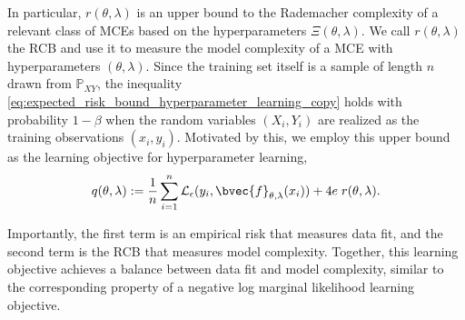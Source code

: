 \documentclass[runningheads, envcountsame, a4paper]{llncs}
\begin{document}
		In particular, $r(\theta, \lambda)$ is an upper bound to the Rademacher complexity of a relevant class of \glspl{MCE} based on the hyperparameters $\Xi(\theta, \lambda)$. We call $r(\theta, \lambda)$ the \gls{RCB} and use it to measure the model complexity of a \gls{MCE} with hyperparameters $(\theta, \lambda)$. Since the training set itself is a sample of length $n$ drawn from $\mathbb{P}_{X Y}$, the inequality \eqref{eq:expected_risk_bound_hyperparameter_learning_copy} holds with probability $1 - \beta$ when the random variables $(X_{i}, Y_{i})$ are realized as the training observations $(x_{i}, y_{i})$. Motivated by this, we employ this upper bound as the learning objective for hyperparameter learning,
		\begin{equation}
			q(\theta, \lambda) := \frac{1}{n} \sum_{i = 1}^{n} \mathcal{L}_{\epsilon}(y_{i}, \bvec{f}_{\theta, \lambda}(x_{i})) + 4 e \; r(\theta, \lambda).
		\label{eq:learning_objective}
		\end{equation}
	
		Importantly, the first term is an empirical risk that measures data fit, and the second term is the \gls{RCB} that measures model complexity. Together, this learning objective achieves a balance between data fit and model complexity, similar to the corresponding property of a negative log marginal likelihood learning objective.
	
\end{document}
